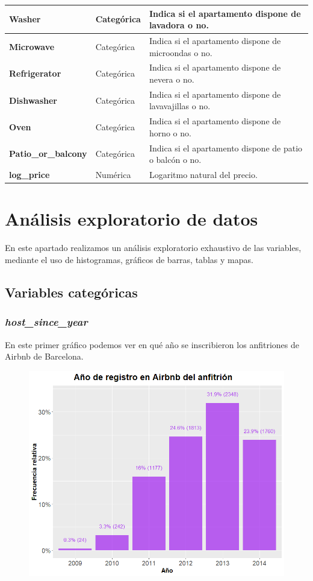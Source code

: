 \documentclass{article}
\begin{document}
\begin{xltabular}{\linewidth}{ l | X | X}
\textbf{Washer} & Categórica &  Indica si el apartamento dispone de lavadora o no. \\ \hline
\textbf{Microwave} & Categórica & Indica si el apartamento dispone de microondas o no. \\ \hline
\textbf{Refrigerator} & Categórica & Indica si el apartamento dispone de nevera o no.  \\ \hline
\textbf{Dishwasher} & Categórica &  Indica si el apartamento dispone de lavavajillas o no. \\ \hline
\textbf{Oven} & Categórica &  Indica si el apartamento dispone de horno o no. \\ \hline
\textbf{Patio\_or\_balcony} & Categórica &  Indica si el apartamento dispone de patio o balcón o no. \\ \hline
\textbf{log\_price} & Numérica &  Logaritmo natural del precio. \\ \hline

\end{xltabular}

\clearpage
\section{Análisis exploratorio de datos}
En este apartado realizamos un análisis exploratorio exhaustivo de las variables, mediante el uso de histogramas, gráficos de barras, tablas y mapas.
\subsection{Variables categóricas}
\subsubsection{\emph{host\_since\_year}}
En este primer gráfico podemos ver en qué año se inscribieron los anfitriones de Airbnb de Barcelona.

\vspace{0.35cm}
\begin{figure}[h]
\hspace*{-0.15cm}
\centering
\includegraphics[scale = 0.6]{host_since_year}
\end{figure}
\vspace{0.35cm}
\end{document}
